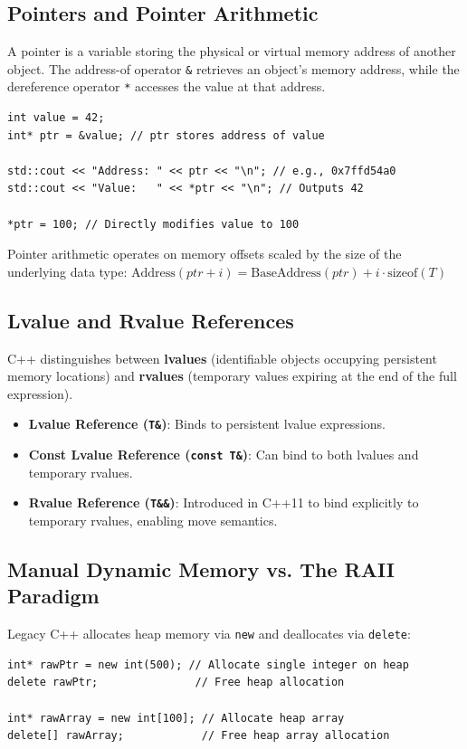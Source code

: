 \documentclass[10pt,journal,compsoc,onecolumn]{IEEEtran}
\begin{document}
\subsection{Pointers and Pointer Arithmetic}
A pointer is a variable storing the physical or virtual memory address of another object. The address-of operator \texttt{\&} retrieves an object's memory address, while the dereference operator \texttt{*} accesses the value at that address.

\begin{verbatim}
int value = 42;
int* ptr = &value; // ptr stores address of value

std::cout << "Address: " << ptr << "\n"; // e.g., 0x7ffd54a0
std::cout << "Value:   " << *ptr << "\n"; // Outputs 42

*ptr = 100; // Directly modifies value to 100
\end{verbatim}

Pointer arithmetic operates on memory offsets scaled by the size of the underlying data type:
$\text{Address}(ptr + i) = \text{BaseAddress}(ptr) + i \cdot \text{sizeof}(T)$

\subsection{Lvalue and Rvalue References}
C++ distinguishes between \textbf{lvalues} (identifiable objects occupying persistent memory locations) and \textbf{rvalues} (temporary values expiring at the end of the full expression).

\begin{itemize}
    \item \textbf{Lvalue Reference (\texttt{T\&})}: Binds to persistent lvalue expressions.
    \item \textbf{Const Lvalue Reference (\texttt{const T\&})}: Can bind to both lvalues and temporary rvalues.
    \item \textbf{Rvalue Reference (\texttt{T\&\&})}: Introduced in C++11 to bind explicitly to temporary rvalues, enabling move semantics.
\end{itemize}

\subsection{Manual Dynamic Memory vs. The RAII Paradigm}
Legacy C++ allocates heap memory via \texttt{new} and deallocates via \texttt{delete}:

\begin{verbatim}
int* rawPtr = new int(500); // Allocate single integer on heap
delete rawPtr;               // Free heap allocation

int* rawArray = new int[100]; // Allocate heap array
delete[] rawArray;            // Free heap array allocation
\end{verbatim}
\end{document}
